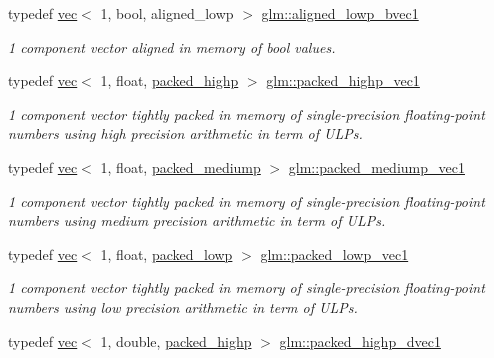 \begin{DoxyCompactItemize}
typedef \mbox{\hyperlink{structglm_1_1vec}{vec}}$<$ 1, bool, aligned\+\_\+lowp $>$ \mbox{\hyperlink{group__gtc__type__aligned_ga188725767d0c2d0331f89574c543e600}{glm\+::aligned\+\_\+lowp\+\_\+bvec1}}
\begin{DoxyCompactList}\small\item\em 1 component vector aligned in memory of bool values. \end{DoxyCompactList}\item 
typedef \mbox{\hyperlink{structglm_1_1vec}{vec}}$<$ 1, float, \mbox{\hyperlink{namespaceglm_a36ed105b07c7746804d7fdc7cc90ff25a8e8791ee77fe079b1291f710d88031bf}{packed\+\_\+highp}} $>$ \mbox{\hyperlink{group__gtc__type__aligned_ga0356e10a8b10f699cf7cf4308f449c83}{glm\+::packed\+\_\+highp\+\_\+vec1}}
\begin{DoxyCompactList}\small\item\em 1 component vector tightly packed in memory of single-\/precision floating-\/point numbers using high precision arithmetic in term of U\+L\+Ps. \end{DoxyCompactList}\item 
typedef \mbox{\hyperlink{structglm_1_1vec}{vec}}$<$ 1, float, \mbox{\hyperlink{namespaceglm_a36ed105b07c7746804d7fdc7cc90ff25a9604654c3b137cd7898689fd34b25bc0}{packed\+\_\+mediump}} $>$ \mbox{\hyperlink{group__gtc__type__aligned_gadf62fccc1514b0dca7ab1067263fca4c}{glm\+::packed\+\_\+mediump\+\_\+vec1}}
\begin{DoxyCompactList}\small\item\em 1 component vector tightly packed in memory of single-\/precision floating-\/point numbers using medium precision arithmetic in term of U\+L\+Ps. \end{DoxyCompactList}\item 
typedef \mbox{\hyperlink{structglm_1_1vec}{vec}}$<$ 1, float, \mbox{\hyperlink{namespaceglm_a36ed105b07c7746804d7fdc7cc90ff25ac36a4bd74559be2c0b65bc48e5953b8b}{packed\+\_\+lowp}} $>$ \mbox{\hyperlink{group__gtc__type__aligned_ga23472ebc3f98baab2a17053bc3788a9c}{glm\+::packed\+\_\+lowp\+\_\+vec1}}
\begin{DoxyCompactList}\small\item\em 1 component vector tightly packed in memory of single-\/precision floating-\/point numbers using low precision arithmetic in term of U\+L\+Ps. \end{DoxyCompactList}\item 
typedef \mbox{\hyperlink{structglm_1_1vec}{vec}}$<$ 1, double, \mbox{\hyperlink{namespaceglm_a36ed105b07c7746804d7fdc7cc90ff25a8e8791ee77fe079b1291f710d88031bf}{packed\+\_\+highp}} $>$ \mbox{\hyperlink{group__gtc__type__aligned_ga28333ae58dc1ce6fdf75a8dba0065603}{glm\+::packed\+\_\+highp\+\_\+dvec1}}

\end{DoxyCompactItemize}
